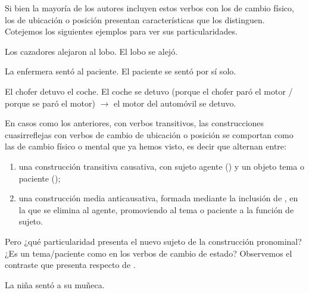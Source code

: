 Si bien la mayoría de los autores incluyen estos verbos con los de cambio
físico, los de ubicación o posición presentan características que los
distinguen. Cotejemos los siguientes ejemplos para ver sus particularidades.

\begin{exe}
  \ex
    \begin{xlist}
      \ex\label{ex:10-lobo-a} Los cazadores alejaron al lobo.
      \ex El lobo se alejó.
    \end{xlist}
  \ex\label{ex:10-sento}
    \begin{xlist}
      \ex\label{ex:10-sento-a} La enfermera sentó al paciente.
      \ex\label{ex:10-sento-b} El paciente se sentó por sí solo.
    \end{xlist}
  \ex
    \begin{xlist}
      \ex\label{ex:10-chofer-a} El chofer detuvo el coche.
      \ex El coche se detuvo (porque el chofer paró el motor / porque se paró el
          motor) $\rightarrow$ el motor del automóvil se detuvo.
    \end{xlist}
\end{exe}

En casos como los anteriores, con verbos transitivos, las construcciones
cuasirreflejas con verbos de cambio de ubicación o posición se comportan como las
de cambio físico o mental que ya hemos visto, es decir que alternan entre:

\begin{enumerate}[label=\alph*)]
  \item una construcción transitiva causativa, con sujeto agente () y un objeto tema o paciente
        ();
  \item una construcción media anticausativa, formada mediante la inclusión de
        , en la que se elimina al agente, promoviendo al tema o
        paciente a la función de sujeto.
\end{enumerate}

Pero ¿qué particularidad presenta el nuevo sujeto de la construcción pronominal?
¿Es un tema/paciente como en los verbos de cambio de estado? Observemos el
contraste que presenta  respecto de .

\begin{exe}
  \ex\label{ex:10-muneca}
    \begin{xlist}
      \ex\label{ex:10-muneca-a} La niña sentó a su muñeca.
    \end{xlist}
\end{exe}

